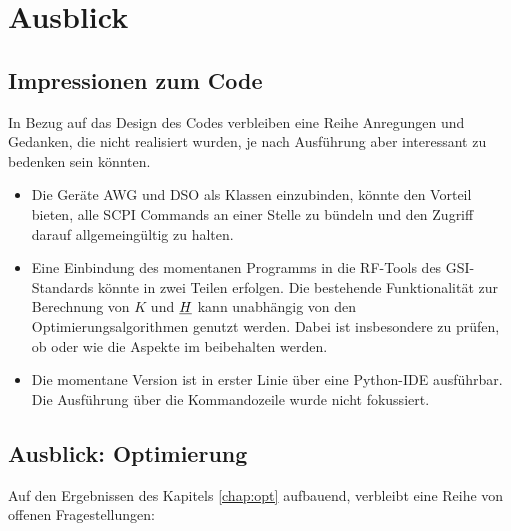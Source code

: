 \documentclass[../Report.tex]{subfiles}
\begin{document}
\chapter{Ausblick}
\label{chap:ausb}

\section{Impressionen zum Code}
\label{sec:ausb.code}
In Bezug auf das Design des Codes verbleiben eine Reihe Anregungen und Gedanken, die nicht realisiert wurden, je nach Ausführung aber interessant zu bedenken sein könnten.

\begin{itemize}
	\item	Die Geräte AWG und DSO als Klassen einzubinden, könnte den Vorteil bieten, alle SCPI Commands an einer Stelle zu bündeln und den Zugriff darauf allgemeingültig zu halten.
	
	\item	Eine Einbindung des momentanen Programms in die RF-Tools des GSI-Standards könnte in zwei Teilen erfolgen. Die bestehende Funktionalität zur Berechnung von $K$ und $\underline{H}$ kann unabhängig von den Optimierungsalgorithmen genutzt werden. Dabei ist insbesondere zu prüfen, ob oder wie die Aspekte im  beibehalten werden. 
	
	\item 	Die momentane Version ist in erster Linie über eine Python-IDE ausführbar. Die Ausführung über die Kommandozeile wurde nicht fokussiert.
	
\end{itemize}





\section{Ausblick: Optimierung}
\label{sec:ausb.opti}

Auf den Ergebnissen des Kapitels \ref{chap:opt} aufbauend, verbleibt eine Reihe von offenen Fragestellungen:
\end{document}
